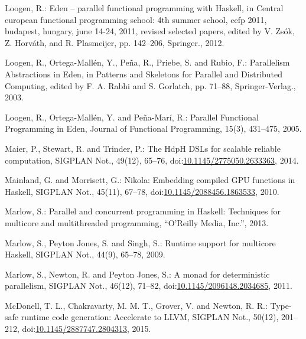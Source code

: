 \documentclass[paper=A4,twoside=true,openright,parskip=full,chapterprefix=true,headings=normal,bibliography=totoc,listof=totoc,titlepage=on,captions=tableabove,draft=false,british]{scrreprt}%
\begin{document}
\leavevmode\hypertarget{ref-Loogen2012}{}%
Loogen, R.: Eden -- parallel functional programming with Haskell, in
Central european functional programming school: 4th summer school, cefp
2011, budapest, hungary, june 14-24, 2011, revised selected papers,
edited by V. Zsók, Z. Horváth, and R. Plasmeijer, pp. 142--206,
Springer., 2012.

\leavevmode\hypertarget{ref-Eden:SkeletonBookChapter02}{}%
Loogen, R., Ortega-Mallén, Y., Peña, R., Priebe, S. and Rubio, F.:
Parallelism Abstractions in Eden, in Patterns and Skeletons for Parallel
and Distributed Computing, edited by F. A. Rabhi and S. Gorlatch, pp.
71--88, Springer-Verlag., 2003.

\leavevmode\hypertarget{ref-eden}{}%
Loogen, R., Ortega-Mallén, Y. and Peña-Marí, R.: Parallel Functional
Programming in Eden, Journal of Functional Programming, 15(3), 431--475,
2005.

\leavevmode\hypertarget{ref-Maier:2014:HDS:2775050.2633363}{}%
Maier, P., Stewart, R. and Trinder, P.: The HdpH DSLs for scalable
reliable computation, SIGPLAN Not., 49(12), 65--76,
doi:\href{https://doi.org/10.1145/2775050.2633363}{10.1145/2775050.2633363},
2014.

\leavevmode\hypertarget{ref-Mainland:2010:NEC:2088456.1863533}{}%
Mainland, G. and Morrisett, G.: Nikola: Embedding compiled GPU functions
in Haskell, SIGPLAN Not., 45(11), 67--78,
doi:\href{https://doi.org/10.1145/2088456.1863533}{10.1145/2088456.1863533},
2010.

\leavevmode\hypertarget{ref-marlow2013parallel}{}%
Marlow, S.: Parallel and concurrent programming in Haskell: Techniques
for multicore and multithreaded programming, ``O'Reilly Media, Inc.'',
2013.

\leavevmode\hypertarget{ref-Marlow2009}{}%
Marlow, S., Peyton Jones, S. and Singh, S.: Runtime support for
multicore Haskell, SIGPLAN Not., 44(9), 65--78, 2009.

\leavevmode\hypertarget{ref-par-monad}{}%
Marlow, S., Newton, R. and Peyton Jones, S.: A monad for deterministic
parallelism, SIGPLAN Not., 46(12), 71--82,
doi:\href{https://doi.org/10.1145/2096148.2034685}{10.1145/2096148.2034685},
2011.

\leavevmode\hypertarget{ref-McDonell:2015:TRC:2887747.2804313}{}%
McDonell, T. L., Chakravarty, M. M. T., Grover, V. and Newton, R. R.:
Type-safe runtime code generation: Accelerate to LLVM, SIGPLAN Not.,
50(12), 201--212,
doi:\href{https://doi.org/10.1145/2887747.2804313}{10.1145/2887747.2804313},
2015.
\end{document}
